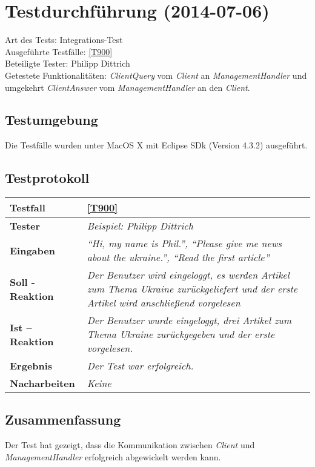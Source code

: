 
\chapter{Testdurchführung (2014-07-06)}

Art des Tests: Integrations-Test\\
Ausgeführte Testfälle: \ref{T900}\\ 
Beteiligte Tester: Philipp Dittrich\\
Getestete Funktionalitäten: \textit{ClientQuery} vom \textit{Client} an
\textit{ManagementHandler} und umgekehrt \textit{ClientAnswer} vom
\textit{ManagementHandler} an den \textit{Client}.

\section{Testumgebung}

Die Testfälle wurden unter MacOS X mit Eclipse SDk (Version 4.3.2) ausgeführt.

\section{Testprotokoll}

\begin{longtable}{|p{4cm}|p{11cm}|}
\hline
\textbf{Testfall} & \ref{T900} \\
\hline
\textbf{Tester} & \textit{Beispiel: Philipp Dittrich} \\
\hline
\textbf{Eingaben} & \textit{``Hi, my name is Phil.'',
``Please give me news about the ukraine.'',
``Read the first article''} \\
\hline
\textbf{Soll - Reaktion} & \textit{Der Benutzer wird eingeloggt, es werden
Artikel zum Thema Ukraine zurückgeliefert und der erste Artikel wird
anschließend vorgelesen}
\\
\hline
\textbf{Ist -- Reaktion} & \textit{Der Benutzer wurde eingeloggt, drei Artikel
zum Thema Ukraine zurückgegeben und der erste vorgelesen.}
\\
\hline
\textbf{Ergebnis} & \textit{Der Test war erfolgreich.} \\
\hline
\textbf{Nacharbeiten } & \textit{Keine} \\
\hline
\end{longtable}

\section{Zusammenfassung}

Der Test hat gezeigt, dass die Kommunikation zwischen \textit{Client} und
\textit{ManagementHandler} erfolgreich abgewickelt werden kann.

